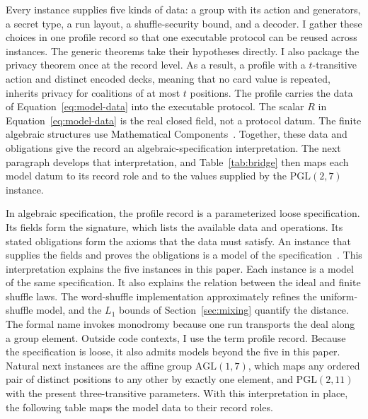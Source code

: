\documentclass[runningheads]{llncs}
\newcommand{\PG}{\mathrm{PGL}(2,7)}
\begin{document}
Every instance supplies five kinds of data: a group with its action and
generators, a secret type, a run layout, a shuffle-security bound, and a
decoder. I gather these choices in one profile record so that one executable
protocol can be reused across instances. The generic theorems take their
hypotheses directly. I also package the privacy theorem once at the record
level. As a result, a profile with a $t$-transitive action and distinct
encoded decks, meaning that no card value is repeated, inherits privacy for
coalitions of at most $t$ positions. The profile carries the data of
Equation~\ref{eq:model-data} into the executable protocol. The scalar $R$ in
Equation~\ref{eq:model-data} is the real closed field, not a protocol datum.
The finite algebraic structures use Mathematical Components~\cite{MathComp}.
Together, these data and obligations give the record an
algebraic-specification interpretation. The next paragraph develops that
interpretation, and Table~\ref{tab:bridge} then maps each model datum to its
record role and to the values supplied by the $\PG$ instance.

In algebraic specification, the profile record is a parameterized loose
specification. Its fields form the signature, which lists the available data
and operations. Its stated obligations form the axioms that the data must
satisfy. An instance that supplies the fields and proves the obligations is a
model of the specification~\cite{GoguenBurstall1992,SannellaTarlecki2012}.
This interpretation explains the five instances in this paper. Each instance
is a model of the same specification. It also explains the relation between
the ideal and finite shuffle laws. The word-shuffle implementation
approximately refines the uniform-shuffle model, and the $L_1$ bounds of
Section~\ref{sec:mixing} quantify the distance. The formal name invokes
monodromy because one run transports the deal along a group element. Outside
code contexts, I use the term profile record. Because the specification is
loose, it also admits models beyond the five in this paper. Natural next
instances are the affine group $\mathrm{AGL}(1,7)$, which maps any ordered
pair of distinct positions to any other by exactly one element, and
$\mathrm{PGL}(2,11)$ with the present three-transitive parameters. With this
interpretation in place, the following table maps the model data to their
record roles.
\end{document}
